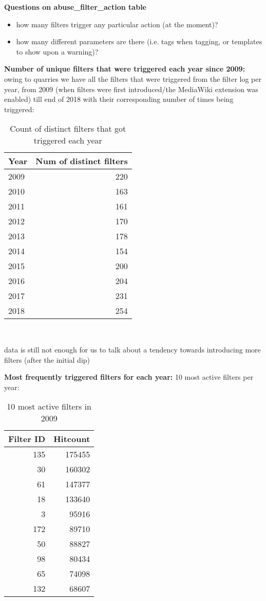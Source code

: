 \textbf{Questions on abuse\_filter\_action table}
\begin{itemize}
    \item how many filters trigger any particular action (at the moment)?
    \item how many different parameters are there (i.e. tags when tagging, or templates to show upon a warning)?
\end{itemize}

\textbf{Number of unique filters that were triggered each year since 2009:}
owing to quarries we have all the filters that were triggered from the filter log per year, from 2009 (when filters were first introduced/the MediaWiki extension was enabled) till end of 2018 with their corresponding number of times being triggered:
\begin{table}
  \centering
  \begin{tabular}{l r }
    Year & Num of distinct filters \\
    \hline
    2009 & 220 \\
    2010 & 163 \\
    2011 & 161 \\
    2012 & 170 \\
    2013 & 178 \\
    2014 & 154 \\
    2015 & 200 \\
    2016 & 204 \\
    2017 & 231 \\
    2018 & 254 \\
  \end{tabular}
  \caption{Count of distinct filters that got triggered each year}~\label{tab:active-filters-count}
\end{table}

data is still not enough for us to talk about a tendency towards introducing more filters (after the initial dip)


\textbf{Most frequently triggered filters for each year:}
10 most active filters per year:
\begin{table}
  \centering
  \begin{tabular}{r r }
    Filter ID & Hitcount \\
    \hline
    135 & 175455 \\
    30 & 160302 \\
    61 & 147377 \\
    18 & 133640 \\
    3 & 95916 \\
    172 & 89710 \\
    50 & 88827 \\
    98 & 80434 \\
    65 & 74098 \\
    132 & 68607 \\
  \end{tabular}
  \caption{10 most active filters in 2009}~\label{tab:most-active-2009}
\end{table}

